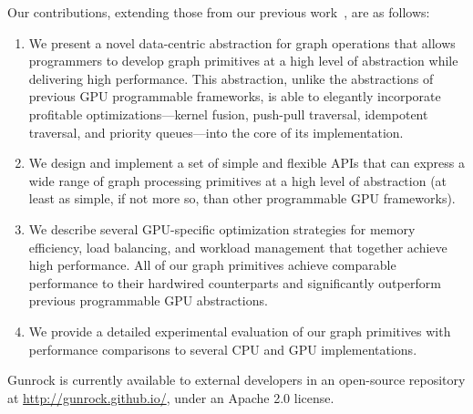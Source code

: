 \documentclass[format=acmsmall,review=false,screen=true]{acmart}
\begin{document}
Our contributions, extending those from our previous
work~\cite{Wang:2016:GAH}, are as follows:
\begin{enumerate}
\item We present a novel data-centric abstraction for graph operations
  that allows programmers to develop graph primitives at a high level
  of abstraction while delivering high performance. This abstraction,
  unlike the abstractions of previous GPU programmable frameworks, is
  able to elegantly incorporate profitable optimizations---kernel
  fusion, push-pull traversal, idempotent traversal, and priority
  queues---into the core of its implementation.
\item We design and implement a set of simple and flexible APIs that
  can express a wide range of graph processing primitives at a high
  level of abstraction (at least as simple, if not more so, than other
  programmable GPU frameworks).
\item We describe several GPU-specific optimization strategies for
  memory efficiency, load balancing, and workload management that
  together achieve high performance. All of our graph primitives
  achieve comparable performance to their hardwired counterparts and
  significantly outperform previous programmable GPU abstractions.
\item We provide a detailed experimental evaluation of our graph
  primitives with performance comparisons to several CPU and GPU
  implementations.
\end{enumerate}
Gunrock is currently available to external developers in an
open-source repository at \url{http://gunrock.github.io/}, under an
Apache 2.0 license.
\end{document}
